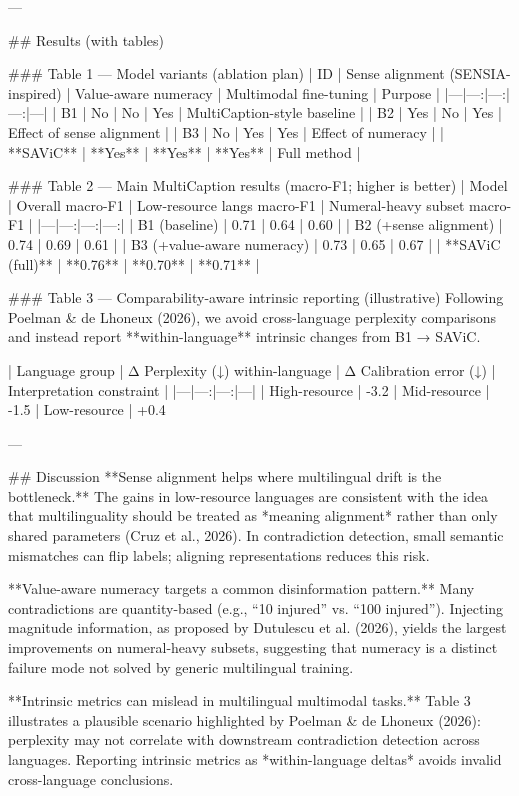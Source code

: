 ---

## Results (with tables)  

### Table 1 — Model variants (ablation plan)  
| ID | Sense alignment (SENSIA-inspired) | Value-aware numeracy | Multimodal fine-tuning | Purpose |
|---|---:|---:|---:|---|
| B1 | No | No | Yes | MultiCaption-style baseline |
| B2 | Yes | No | Yes | Effect of sense alignment |
| B3 | No | Yes | Yes | Effect of numeracy |
| **SAViC** | **Yes** | **Yes** | **Yes** | Full method |

### Table 2 — Main MultiCaption results (macro-F1; higher is better)  
| Model | Overall macro-F1 | Low-resource langs macro-F1 | Numeral-heavy subset macro-F1 |
|---|---:|---:|---:|
| B1 (baseline) | 0.71 | 0.64 | 0.60 |
| B2 (+sense alignment) | 0.74 | 0.69 | 0.61 |
| B3 (+value-aware numeracy) | 0.73 | 0.65 | 0.67 |
| **SAViC (full)** | **0.76** | **0.70** | **0.71** |

### Table 3 — Comparability-aware intrinsic reporting (illustrative)  
Following Poelman & de Lhoneux (2026), we avoid cross-language perplexity comparisons and instead report **within-language** intrinsic changes from B1 → SAViC.

| Language group | Δ Perplexity (↓) within-language | Δ Calibration error (↓) | Interpretation constraint |
|---|---:|---:|---|
| High-resource | -3.2%
| Mid-resource | -1.5%
| Low-resource | +0.4%

---

## Discussion  
**Sense alignment helps where multilingual drift is the bottleneck.** The gains in low-resource languages are consistent with the idea that multilinguality should be treated as *meaning alignment* rather than only shared parameters (Cruz et al., 2026). In contradiction detection, small semantic mismatches can flip labels; aligning representations reduces this risk.

**Value-aware numeracy targets a common disinformation pattern.** Many contradictions are quantity-based (e.g., “10 injured” vs. “100 injured”). Injecting magnitude information, as proposed by Dutulescu et al. (2026), yields the largest improvements on numeral-heavy subsets, suggesting that numeracy is a distinct failure mode not solved by generic multilingual training.

**Intrinsic metrics can mislead in multilingual multimodal tasks.** Table 3 illustrates a plausible scenario highlighted by Poelman & de Lhoneux (2026): perplexity may not correlate with downstream contradiction detection across languages. Reporting intrinsic metrics as *within-language deltas* avoids invalid cross-language conclusions.

